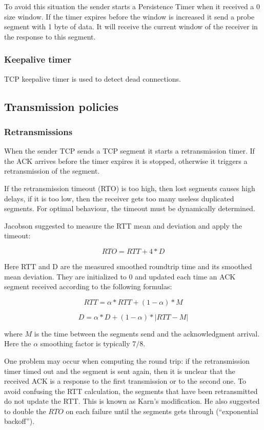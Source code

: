 To avoid this situation the sender starts a Persistence Timer when it received
a 0 size window. If the timer expires before the window is increased it send
a probe segment with 1 byte of data. It will receive the current window of the
receiver in the response to this segment.

\subsubsection*{Keepalive timer}

TCP keepalive timer is used to detect dead connections.

\subsection{Transmission policies}
\label{subsec:trans_policies}

\subsubsection*{Retransmissions}


When the sender TCP sends a TCP segment it starts a
retransmission timer.
If the ACK arrives before the timer expires it is stopped,
otherwise it triggers a retransmission of the segment.

If the retransmission timeout (RTO) is too high, then lost segments
causes high delays, if it is too low, then the receiver gets
too many useless duplicated segments. For optimal behaviour, the
timeout must be dynamically determined.

Jacobson suggested to measure the RTT mean and deviation
and apply the timeout:

$$ RTO = RTT + 4 * D $$

Here RTT and D are the measured smoothed roundtrip time and its
smoothed mean deviation. They are initialized to 0 and updated each time an
ACK segment received according to the following formulas:

$$ RTT = \alpha*RTT + (1-\alpha) * M $$

$$ D = \alpha*D + (1-\alpha)*|RTT-M| $$

where $M$ is the time between the segments send and the acknowledgment
arrival. Here the $\alpha$ smoothing factor is typically $7/8$.

One problem may occur when computing the round trip: if the
retransmission timer timed out and the segment is sent again,
then it is unclear that the received ACK is a response to the
first transmission or to the second one. To avoid confusing the
RTT calculation, the segments that have been retransmitted
do not update the RTT. This is known as Karn's modification.
He also suggested to double the $RTO$ on each failure until the
segments gets through (``exponential backoff'').

